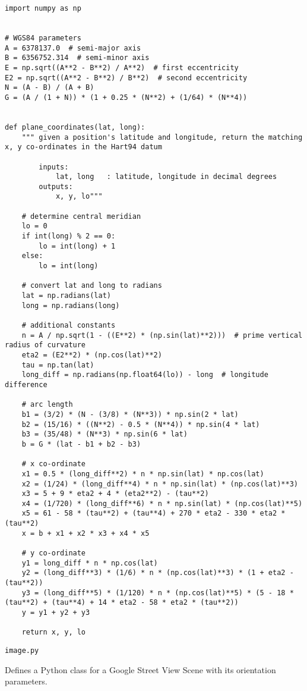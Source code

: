 \begin{lstlisting}
import numpy as np


# WGS84 parameters
A = 6378137.0  # semi-major axis
B = 6356752.314  # semi-minor axis
E = np.sqrt((A**2 - B**2) / A**2)  # first eccentricity
E2 = np.sqrt((A**2 - B**2) / B**2)  # second eccentricity
N = (A - B) / (A + B)
G = (A / (1 + N)) * (1 + 0.25 * (N**2) + (1/64) * (N**4))


def plane_coordinates(lat, long):
    """ given a position's latitude and longitude, return the matching x, y co-ordinates in the Hart94 datum

        inputs:
            lat, long   : latitude, longitude in decimal degrees
        outputs:
            x, y, lo"""

    # determine central meridian
    lo = 0
    if int(long) % 2 == 0:
        lo = int(long) + 1
    else:
        lo = int(long)

    # convert lat and long to radians
    lat = np.radians(lat)
    long = np.radians(long)

    # additional constants
    n = A / np.sqrt(1 - ((E**2) * (np.sin(lat)**2)))  # prime vertical radius of curvature
    eta2 = (E2**2) * (np.cos(lat)**2)
    tau = np.tan(lat)
    long_diff = np.radians(np.float64(lo)) - long  # longitude difference

    # arc length
    b1 = (3/2) * (N - (3/8) * (N**3)) * np.sin(2 * lat)
    b2 = (15/16) * ((N**2) - 0.5 * (N**4)) * np.sin(4 * lat)
    b3 = (35/48) * (N**3) * np.sin(6 * lat)
    b = G * (lat - b1 + b2 - b3)

    # x co-ordinate
    x1 = 0.5 * (long_diff**2) * n * np.sin(lat) * np.cos(lat)
    x2 = (1/24) * (long_diff**4) * n * np.sin(lat) * (np.cos(lat)**3)
    x3 = 5 + 9 * eta2 + 4 * (eta2**2) - (tau**2)
    x4 = (1/720) * (long_diff**6) * n * np.sin(lat) * (np.cos(lat)**5)
    x5 = 61 - 58 * (tau**2) + (tau**4) + 270 * eta2 - 330 * eta2 * (tau**2)
    x = b + x1 + x2 * x3 + x4 * x5

    # y co-ordinate
    y1 = long_diff * n * np.cos(lat)
    y2 = (long_diff**3) * (1/6) * n * (np.cos(lat)**3) * (1 + eta2 - (tau**2))
    y3 = (long_diff**5) * (1/120) * n * (np.cos(lat)**5) * (5 - 18 * (tau**2) + (tau**4) + 14 * eta2 - 58 * eta2 * (tau**2))
    y = y1 + y2 + y3

    return x, y, lo
\end{lstlisting}

\verb|image.py|

Defines a Python class for a Google Street View Scene with its orientation parameters.

